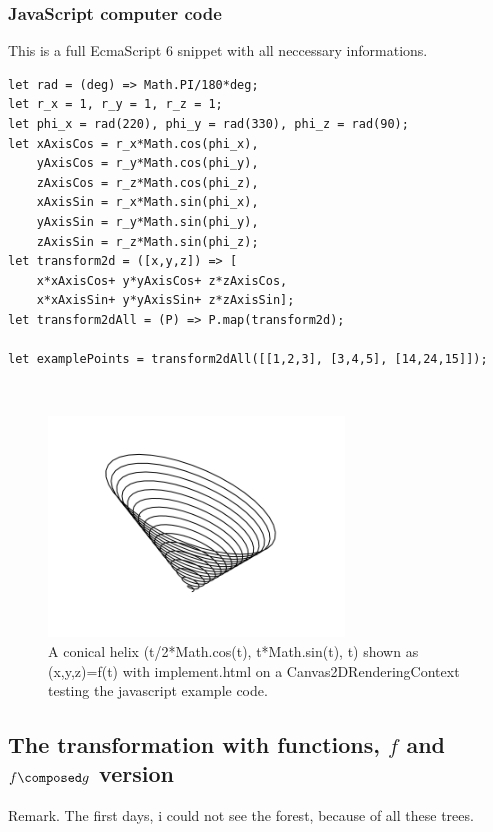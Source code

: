 \documentclass[a4paper]{article}
\begin{document}
\subsubsection{JavaScript computer code}
\begin{example}
This is a full EcmaScript 6 snippet with all neccessary informations.\\
\begin{lstlisting}
let rad = (deg) => Math.PI/180*deg;
let r_x = 1, r_y = 1, r_z = 1; 
let phi_x = rad(220), phi_y = rad(330), phi_z = rad(90); 
let xAxisCos = r_x*Math.cos(phi_x), 
    yAxisCos = r_y*Math.cos(phi_y),
    zAxisCos = r_z*Math.cos(phi_z),
    xAxisSin = r_x*Math.sin(phi_x), 
    yAxisSin = r_y*Math.sin(phi_y),
    zAxisSin = r_z*Math.sin(phi_z);
let transform2d = ([x,y,z]) => [
    x*xAxisCos+ y*yAxisCos+ z*zAxisCos,
    x*xAxisSin+ y*yAxisSin+ z*zAxisSin];
let transform2dAll = (P) => P.map(transform2d);

let examplePoints = transform2dAll([[1,2,3], [3,4,5], [14,24,15]]);
\end{lstlisting}
\end{example}\\


\begin{figure}[ht]
\includegraphics[scale=0.5]{conicalhelix.png}
\caption{A conical helix (t/2*Math.cos(t), t*Math.sin(t), t) shown as (x,y,z)=f(t) with implement.html on a Canvas2DRenderingContext testing the javascript example code.}
\end{figure}


\subsection{The transformation with functions, $f$ and $f \composed g$ version}

Remark. The first days, i could not see the forest, because of all these trees. 
\end{document}
